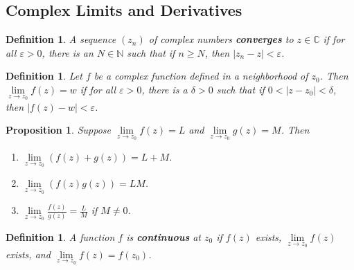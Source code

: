 \documentclass{article}
\theoremstyle{colontheorem}
\newtheorem{proposition}[theorem]{Proposition}
\newtheorem{definition}[theorem]{Definition}
\newenvironment{Proposition}
{
	\begin{mdframed}[backgroundcolor=TheoremOrange!10]
	\begin{proposition}
}
{
	\end{proposition}
	\end{mdframed}
	
	\vspace{.15in}
}
\newenvironment{Def}
{
	\begin{mdframed}[backgroundcolor=DefGreen!10]
	\begin{definition}
}
{
	\end{definition}
	\end{mdframed}
	
	\vspace{.15in}
}
\begin{document}
\begin{center}
	\pagebreak
	
	\section{Complex Limits and Derivatives}
	
	\vspace{.1in}
\end{center}



\begin{Def}
	
	A sequence $(z_n)$ of complex numbers \textbf{converges} to $z \in \mathbb{C}$ if for all $\varepsilon > 0$, there is an $N \in \mathbb{N}$ such that if $n \geq N$, then $|z_n - z| < \varepsilon$.
	
\end{Def}



\begin{Def}
	
	Let $f$ be a complex function defined in a neighborhood of $z_0$. Then $\lim\limits_{z \to z_0} f(z) = w$ if for all $\varepsilon > 0$, there is a $\delta > 0$ such that if $0 < |z - z_0| < \delta$, then $|f(z) - w| < \varepsilon$.
	
\end{Def}



\begin{Proposition}
	
	Suppose $\lim\limits_{z \to z_0} f(z) = L$ and $\lim\limits_{z \to z_0} g(z) = M$. Then
	
	\begin{enumerate}
		
		\item $\lim\limits_{z \to z_0} (f(z) + g(z)) = L + M$.
		
		\item $\lim\limits_{z \to z_0} (f(z)g(z)) = LM$.
		
		\item $\lim\limits_{z \to z_0} \frac{f(z)}{g(z)} = \frac{L}{M}$ if $M \neq 0$.
		
	\end{enumerate}
	
\end{Proposition}



\begin{Def}
	
	A function $f$ is \textbf{continuous} at $z_0$ if $f(z)$ exists, $\lim\limits_{z \to z_0} f(z)$ exists, and $\lim\limits_{z \to z_0} f(z) = f(z_0)$.
	
\end{Def}
\end{document}
